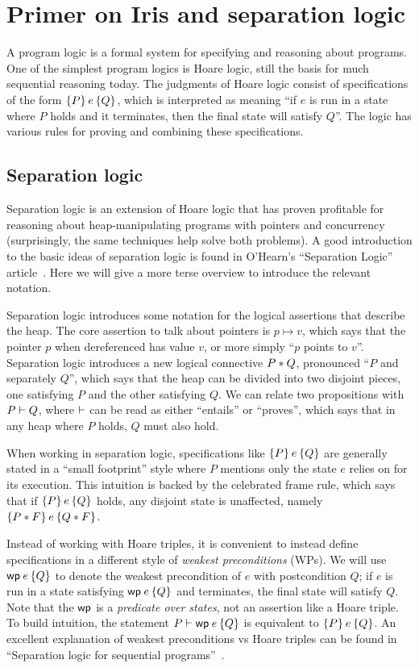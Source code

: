 \section{Primer on Iris and separation logic}

A program logic is a formal system for specifying and reasoning about programs.
One of the simplest program logics is Hoare logic, still the basis for much
sequential reasoning today. The judgments of Hoare logic consist of
specifications of the form $\hoare{P}{e}{Q}$, which is interpreted as meaning
``if $e$ is run in a state where $P$ holds and it terminates, then the final
state will satisfy $Q$''. The logic has various rules for proving and combining
these specifications.

\subsection{Separation logic}

Separation logic is an extension of Hoare logic that has proven profitable for
reasoning about heap-manipulating programs with pointers and concurrency
(surprisingly, the same techniques help solve both problems). A good
introduction to the basic ideas of separation logic is found in O'Hearn's
``Separation Logic'' article~\cite{ohearn:seplogic}. Here we will give a more
terse overview to introduce the relevant notation.

Separation logic introduces some notation for the logical assertions that
describe the heap. The core assertion to talk about pointers is $p \mapsto v$,
which says that the pointer $p$ when dereferenced has value $v$, or more simply
``$p$ points to $v$''. Separation logic introduces a new logical connective
$P * Q$, pronounced ``$P$ and separately $Q$'', which says that the heap can
be divided into two disjoint pieces, one satisfying $P$ and the other satisfying
$Q$. We can relate two propositions with $P \vdash Q$, where $\vdash$ can be
read as either ``entails'' or ``proves'', which says that in any heap where $P$
holds, $Q$ must also hold.

When working in separation logic, specifications like $\hoare{P}{e}{Q}$ are
generally stated in a ``small footprint'' style where $P$ mentions only the
state $e$ relies on for its execution. This intuition is backed by the
celebrated frame rule, which says that if $\hoare{P}{e}{Q}$ holds, any disjoint
state is unaffected, namely $\hoare{P \sep F}{e}{Q \sep F}$.

Instead of working with Hoare triples, it is convenient to instead define
specifications in a different style of \emph{weakest preconditions} (WPs). We will use
$\wpre{e}{Q}$ to denote the weakest precondition of $e$ with postcondition $Q$;
if $e$ is run in a state satisfying $\wpre{e}{Q}$ and terminates, the final
state will satisfy $Q$. Note that the $\textsf{\upshape wp}$ is a \emph{predicate over
states}, not an assertion like a Hoare triple. To build intuition, the statement
$P \proves \wpre{e}{Q}$ is equivalent to $\hoare{P}{e}{Q}$. An excellent
explanation of weakest preconditions vs Hoare triples can be found in
``Separation logic for sequential programs''~\cite{chargueraud:seq-seplogic}.

